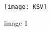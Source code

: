 \documentclass{article}
\begin{document}
	\begin{figure}
		\centering
		\texttt{[image: KSV]}
		\caption{image 1}
		\label{fig:example}
	\end{figure}
\end{document}
